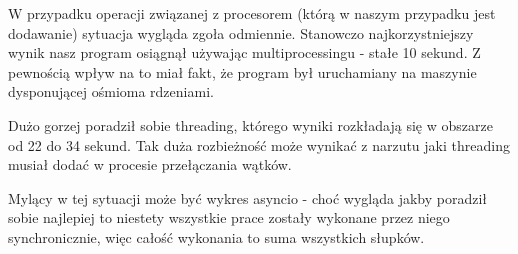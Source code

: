 W przypadku operacji związanej z procesorem (którą w naszym przypadku jest dodawanie) sytuacja wygląda zgoła odmiennie. Stanowczo najkorzystniejszy wynik nasz program osiągnął używając multiprocessingu - stałe 10 sekund. Z pewnością wpływ na to miał fakt, że program był uruchamiany na maszynie dysponującej ośmioma rdzeniami. 

Dużo gorzej poradził sobie threading, którego wyniki rozkładają się w obszarze od 22 do 34 sekund. Tak duża rozbieżność może wynikać z narzutu jaki threading musiał dodać w procesie przełączania wątków.

Mylący w tej sytuacji może być wykres asyncio - choć wygląda jakby poradził sobie najlepiej to niestety wszystkie prace zostały wykonane przez niego synchronicznie, więc całość wykonania to suma wszystkich słupków.